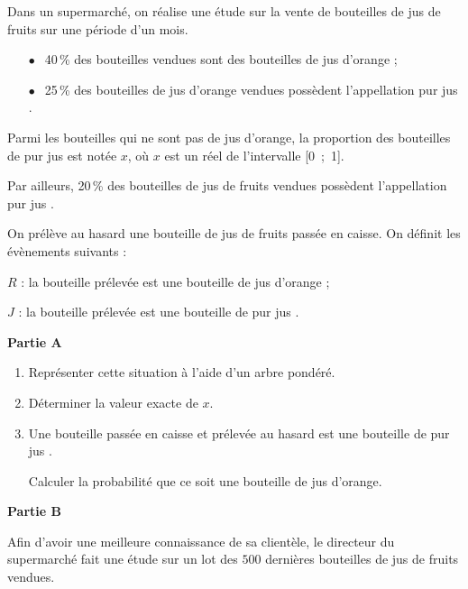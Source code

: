 \documentclass[12pt,frenchb]{article}
\begin{document}
\begin{question}[subtitle={Antilles Guyane septembre 2015}]
Dans un supermarché, on réalise une étude sur la vente de bouteilles de jus de fruits sur une période d'un mois.

\setlength\parindent{8mm}
\begin{itemize}
\item[$\bullet~~$]40\,\% des bouteilles vendues sont des bouteilles de jus d'orange ;
\item[$\bullet~~$]25\,\% des bouteilles de jus d'orange vendues possèdent l'appellation \og pur jus \fg.
\end{itemize}
\setlength\parindent{0mm} 

\medskip

Parmi les bouteilles qui ne sont pas de jus d'orange, la proportion des bouteilles de \og pur jus \fg{} est notée $x$, où $x$ est un réel de l'intervalle [0~;~1].

Par ailleurs, 20\,\% des bouteilles de jus de fruits vendues possèdent l'appellation \og pur jus \fg.

On prélève au hasard une bouteille de jus de fruits passée en caisse. On définit les évènements suivants :

$R$ : la bouteille prélevée est une bouteille de jus d'orange ;

$J$ : la bouteille prélevée est une bouteille de \og pur jus \fg.

\bigskip

\textbf{Partie A}

\medskip

\begin{enumerate}
\item Représenter cette situation à l'aide d'un arbre pondéré.
\item Déterminer la valeur exacte de $x$.
\item Une bouteille passée en caisse et prélevée au hasard est une bouteille de \og pur jus \fg.

Calculer la probabilité que ce soit une bouteille de jus d'orange.
\end{enumerate}

\bigskip

\textbf{Partie B}

\medskip

Afin d'avoir une meilleure connaissance de sa clientèle, le directeur du supermarché fait une étude sur un lot des $500$ dernières bouteilles de jus de fruits vendues.


\end{question}
\end{document}
